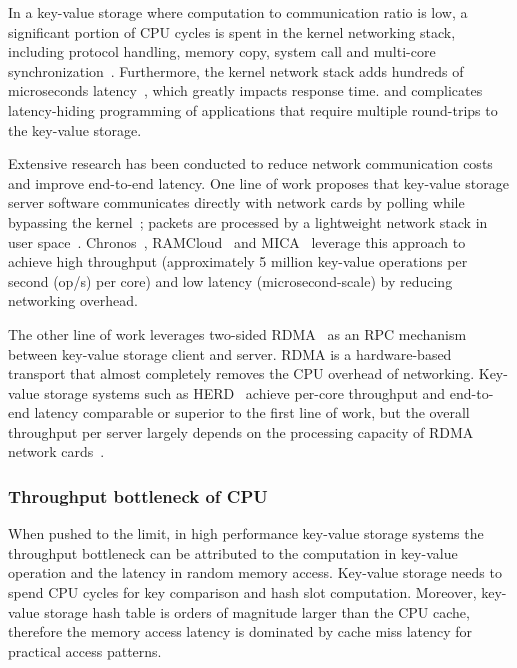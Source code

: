 In a key-value storage where computation to communication ratio is low, a significant portion of CPU cycles is spent in the kernel networking stack, including protocol handling, memory copy, system call and multi-core synchronization~\cite{peter2016arrakis}.
Furthermore, the kernel network stack adds hundreds of microseconds latency~\cite{ousterhout2015ramcloud}, which greatly impacts response time.
and complicates latency-hiding programming of applications that require multiple round-trips to the key-value storage.

Extensive research has been conducted to reduce network communication costs and improve end-to-end latency. One line of work proposes that key-value storage server software communicates directly with network cards by polling while bypassing the kernel~\cite{rizzo2012netmap, intel2014data}; packets are processed by a lightweight network stack in user space~\cite{jeong2014mtcp, marinos2014network}. Chronos~\cite{kapoor2012chronos}, RAMCloud~\cite{ousterhout2010case, ousterhout2015ramcloud} and MICA~\cite{lim2014mica,li2016full} leverage this approach to achieve high throughput (approximately 5 million key-value operations per second (op/s) per core) and low latency (microsecond-scale) by reducing networking overhead.

The other line of work leverages two-sided RDMA~\cite{infiniband2000infiniband} as an RPC mechanism between key-value storage client and server. RDMA is a hardware-based transport that almost completely removes the CPU overhead of networking. Key-value storage systems such as HERD~\cite{kalia2014using, kalia2016design} achieve per-core throughput and end-to-end latency comparable or superior to the first line of work, but the overall throughput per server largely depends on the processing capacity of RDMA network cards~\cite{kalia2016design}.

\subsubsection{Throughput bottleneck of CPU}
\label{kvdirect:sec:CPU-键值-Bottleneck}
When pushed to the limit, in high performance key-value storage systems the throughput bottleneck can be attributed to the computation in key-value operation and the latency in random memory access. Key-value storage needs to spend CPU cycles for key comparison and hash slot computation. Moreover, key-value storage hash table is orders of magnitude larger than the CPU cache, therefore the memory access latency is dominated by cache miss latency for practical access patterns.

